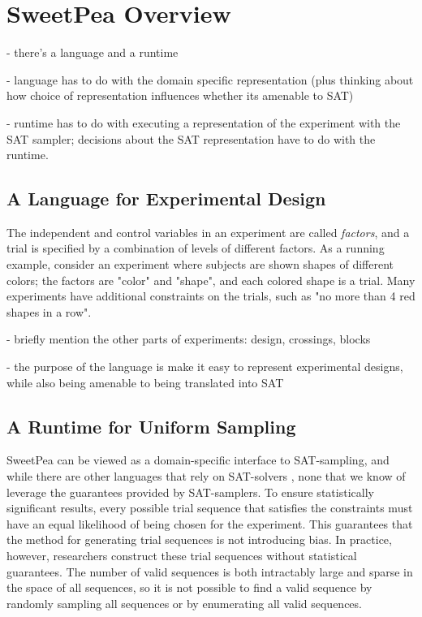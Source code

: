 
\chapter{SweetPea Overview}

- there's a language and a runtime

- language has to do with the domain specific representation (plus thinking about how choice of representation influences whether its amenable to SAT)

- runtime has to do with executing a representation of the experiment with the SAT sampler; decisions about the SAT representation have to do with the runtime.

\section{A Language for Experimental Design}


The independent and control variables in an experiment are called \textit{factors}, and a trial is specified by a combination of levels of different factors. As a running example, consider an experiment where subjects are shown shapes of different colors; the factors are "color" and "shape", and each colored shape is a trial. Many experiments have additional constraints on the trials, such as "no more than 4 red shapes in a row".

- briefly mention the other parts of experiments: design, crossings, blocks

- the purpose of the language is make it easy to represent experimental designs, while also being amenable to being translated into SAT


\section{A Runtime for Uniform Sampling}

SweetPea can be viewed as a domain-specific interface to SAT-sampling, and while there are other languages that rely on SAT-solvers \cite{torlak2014lightweight}, none that we know of leverage the guarantees provided by SAT-samplers. To ensure statistically significant results, every possible trial sequence that satisfies the constraints must have an equal likelihood of being chosen for the experiment. This guarantees that the method for generating trial sequences is not introducing bias. In practice, however, researchers construct these trial sequences without statistical guarantees. The number of valid sequences is both intractably large and sparse in the space of all sequences, so it is not possible to find a valid sequence by randomly sampling all sequences or by enumerating all valid sequences.

